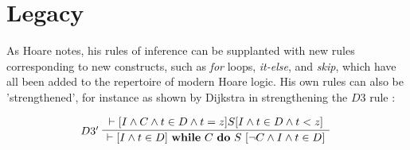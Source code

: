 \documentclass[11pt]{article}
\newenvironment{bprooftree}
  {\leavevmode\hbox\bgroup}
  {\DisplayProof\egroup}
\begin{document}
\section{Legacy}

As Hoare notes, his rules of inference can be supplanted with new rules
corresponding to new constructs, such as \textit{for} loops, \textit{it-else},
and \textit{skip}, which have all been added to the repertoire of modern Hoare 
logic. His own rules can also be 'strengthened', for instance as shown by
Dijkstra in strengthening the $D3$ rule \cite{dijkstra1978guarded}:

\[
    \noindent\begin{tabular}{l c r}
        \begin{bprooftree}
            \LeftLabel{$D3'$}
            \AxiomC{$ \vdash [I \land C \land t \in D \land t = z] S 
                    [I \land t \in D \land t < z]$}
            \UnaryInfC{$ \vdash [I \land t \in D] $ \textbf{while} $C$ 
                       \textbf{do} $S$ $ [\lnot C \land I \land t \in D] $}
        \end{bprooftree} 
    \end{tabular}
\]
\end{document}
